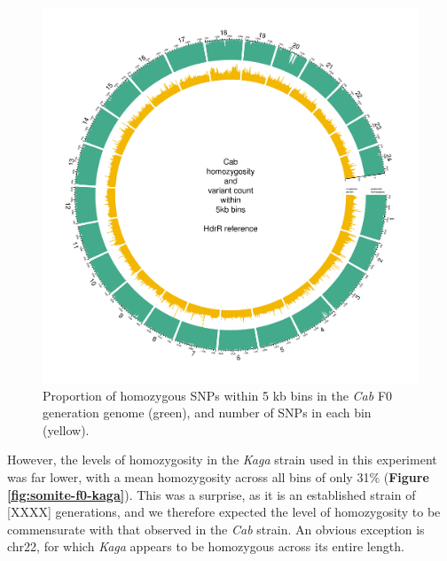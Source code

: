 \documentclass[
]{book}
\begin{document}
\begin{figure}
\includegraphics[width=1\linewidth]{figs/somites/Cab} \caption{Proportion of homozygous SNPs within 5 kb bins in the \emph{Cab} F0 generation genome (green), and number of SNPs in each bin (yellow).}\label{fig:somite-f0-cab}
\end{figure}

However, the levels of homozygosity in the \emph{Kaga} strain used in this experiment was far lower, with a mean homozygosity across all bins of only 31\% (\textbf{Figure \ref{fig:somite-f0-kaga}}). This was a surprise, as it is an established strain of {[}XXXX{]} generations, and we therefore expected the level of homozygosity to be commensurate with that observed in the \emph{Cab} strain. An obvious exception is chr22, for which \emph{Kaga} appears to be homozygous across its entire length.
\end{document}

